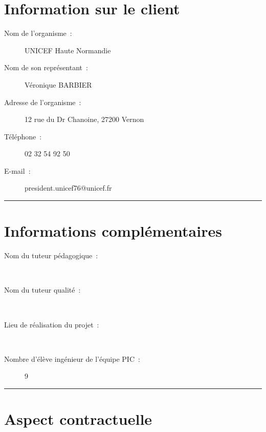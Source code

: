 	
\section*{Information sur le client}
	\begin{description}
		\item[Nom de l'organisme~:] UNICEF Haute Normandie \\
		\item[Nom de son représentant~:] Véronique BARBIER \\
		\item[Adresse de l'organisme~:] 12 rue  du Dr Chanoine, 27200 Vernon \\
		\item[Téléphone~:] 02 32 54 92 50 \\
		\item[E-mail~:] president.unicef76@unicef.fr \\
	\end{description}
	
	
	\vspace{1cm}
	\noindent\hfil\rule{\textwidth}{.4pt}\hfil
	\vspace{1cm}	
	
\section*{Informations complémentaires}
	
	\begin{description}
	
		\item[Nom du tuteur pédagogique~:] \nomTuteurPedago \\
		\item[Nom du tuteur qualité~:] \nomTuteurQualite \\
		\item[Lieu de réalisation du projet~:] \adresseSalle \\
		\item[Nombre d'élève ingénieur de l'équipe PIC~:] 9 \\
	\end{description}	
	
	\noindent\hfil\rule{\textwidth}{.4pt}\hfil	
	
	\section*{Aspect contractuelle}
	
